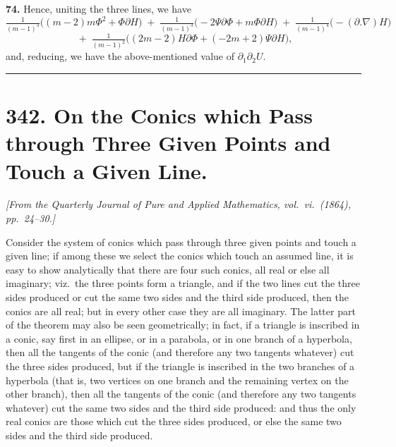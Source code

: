 \documentclass[11pt,a4paper]{article}
\begin{document}
\medskip

\textbf{74.} Hence, uniting the three lines, we have
\[
\tfrac{1}{(m-1)^3}\bigl((m-2)m\Phi^2 + \Phi\partial H\bigr)\;+\;\tfrac{1}{(m-1)^3}\bigl(-2\Psi\partial\Phi + m\Phi\partial H\bigr) \;+\; \tfrac{1}{(m-1)^4}\bigl(-(\partial.\nabla)H\bigr)
\]
\[
\;+\; \tfrac{1}{(m-1)^2}\bigl((2m-2)H\partial\Phi + (-2m+2)\Psi\partial H\bigr),
\]
and, reducing, we have the above-mentioned value of $\partial_1\partial_2 U$.


\bigskip
\noindent\rule{\textwidth}{0.4pt}
\bigskip

\section*{342. On the Conics which Pass through Three Given Points and Touch a Given Line.}

\noindent\textit{[From the Quarterly Journal of Pure and Applied Mathematics, vol.~vi.\ (1864), pp.~24--30.]}

\medskip

Consider the system of conics which pass through three given points and touch a given line; if among these we select the conics which touch an assumed line, it is easy to show analytically that there are four such conics, all real or else all imaginary; viz.\ the three points form a triangle, and if the two lines cut the three sides produced or cut the same two sides and the third side produced, then the conics are all real; but in every other case they are all imaginary. The latter part of the theorem may also be seen geometrically; in fact, if a triangle is inscribed in a conic, say first in an ellipse, or in a parabola, or in one branch of a hyperbola, then all the tangents of the conic (and therefore any two tangents whatever) cut the three sides produced, but if the triangle is inscribed in the two branches of a hyperbola (that is, two vertices on one branch and the remaining vertex on the other branch), then all the tangents of the conic (and therefore any two tangents whatever) cut the same two sides and the third side produced: and thus the only real conics are those which cut the three sides produced, or else the same two sides and the third side produced.

\medskip
\end{document}
